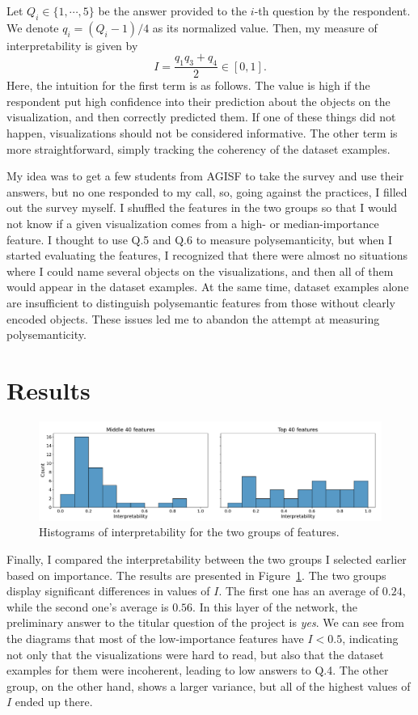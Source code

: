 \documentclass[12pt]{article}
\begin{document}
Let $Q_i\in\{1,\cdots,5\}$ be the answer provided to the $i$-th question by the respondent. We denote $q_i=(Q_i-1) / 4$ as its normalized value. Then, my measure of interpretability is given by
\begin{equation}
  I=\frac{q_1q_3+q_4}{2}\in[0,1].
\end{equation}
Here, the intuition for the first term is as follows. The value is high if the respondent put high confidence into their prediction about the objects on the visualization, and then correctly predicted them. If one of these things did not happen, visualizations should not be considered informative. The other term is more straightforward, simply tracking the coherency of the dataset examples.

My idea was to get a few students from AGISF to take the survey and use their answers, but no one responded to my call, so, going against the practices, I filled out the survey myself. I shuffled the features in the two groups so that I would not know if a given visualization comes from a high- or median-importance feature. I thought to use Q.5 and Q.6 to measure polysemanticity, but when I started evaluating the features, I recognized that there were almost no situations where I could name several objects on the visualizations, and then all of them would appear in the dataset examples. At the same time, dataset examples alone are insufficient to distinguish polysemantic features from those without clearly encoded objects. These issues led me to abandon the attempt at measuring polysemanticity. 

\section{Results}
\begin{figure}[t]
    \centering
    \includegraphics[width=\linewidth]{fig/groups_interp.pdf}
    \caption{Histograms of interpretability for the two groups of features.}
    \label{fig:comp}
\end{figure}
Finally, I compared the interpretability between the two groups I selected earlier based on importance. The results are presented in Figure~\ref{fig:comp}. The two groups display significant differences in values of $I$. The first one has an average of $0.24$, while the second one's average is $0.56$. In this layer of the network, the preliminary answer to the titular question of the project is \textit{yes}. We can see from the diagrams that most of the low-importance features have $I<0.5$, indicating not only that the visualizations were hard to read, but also that the dataset examples for them were incoherent, leading to low answers to Q.4. The other group, on the other hand, shows a larger variance, but all of the highest values of $I$ ended up there.
\end{document}
